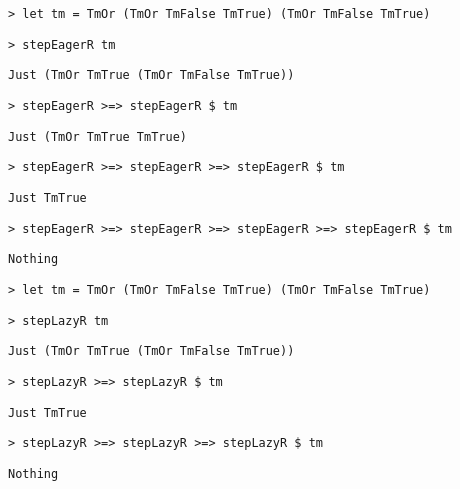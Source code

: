 \begin{frame}[fragile]
  \onslide<+->
  \begin{verbatim}
> let tm = TmOr (TmOr TmFalse TmTrue) (TmOr TmFalse TmTrue)
  \end{verbatim}
  \onslide<+->
  \begin{verbatim}
> stepEagerR tm
  \end{verbatim}
  \onslide<+->
  \begin{verbatim}
Just (TmOr TmTrue (TmOr TmFalse TmTrue))
  \end{verbatim}
  \onslide<+->
  \begin{verbatim}
> stepEagerR >=> stepEagerR $ tm
  \end{verbatim}
  \onslide<+->
  \begin{verbatim}
Just (TmOr TmTrue TmTrue)
  \end{verbatim}
  \onslide<+->
  \begin{verbatim}
> stepEagerR >=> stepEagerR >=> stepEagerR $ tm
  \end{verbatim}
  \onslide<+->
  \begin{verbatim}
Just TmTrue
  \end{verbatim}
  \onslide<+->
  \begin{verbatim}
> stepEagerR >=> stepEagerR >=> stepEagerR >=> stepEagerR $ tm
  \end{verbatim}
  \onslide<+->
  \begin{verbatim}
Nothing
  \end{verbatim}
\end{frame}

\begin{frame}[fragile]
  \onslide<+->
  \begin{verbatim}
> let tm = TmOr (TmOr TmFalse TmTrue) (TmOr TmFalse TmTrue)
  \end{verbatim}
  \onslide<+->
  \begin{verbatim}
> stepLazyR tm
  \end{verbatim}
  \onslide<+->
  \begin{verbatim}
Just (TmOr TmTrue (TmOr TmFalse TmTrue))
  \end{verbatim}
  \onslide<+->
  \begin{verbatim}
> stepLazyR >=> stepLazyR $ tm
  \end{verbatim}
  \onslide<+->
  \begin{verbatim}
Just TmTrue
  \end{verbatim}
  \onslide<+->
  \begin{verbatim}
> stepLazyR >=> stepLazyR >=> stepLazyR $ tm
  \end{verbatim}
  \onslide<+->
  \begin{verbatim}
Nothing
  \end{verbatim}
\end{frame}


